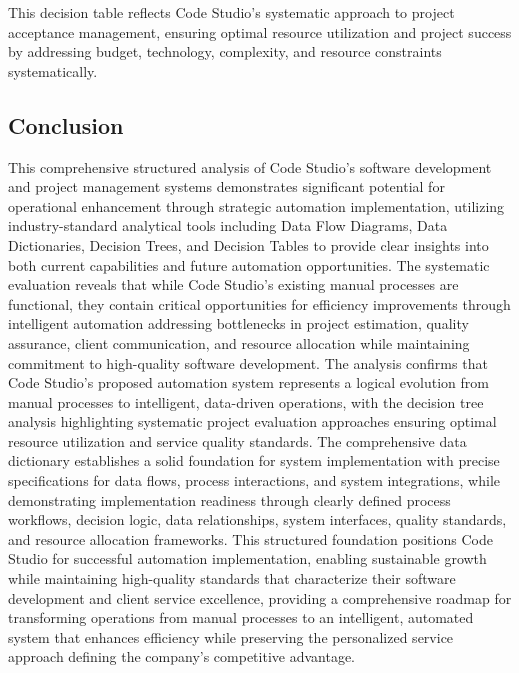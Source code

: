 \documentclass[12pt,a4paper]{article}
\begin{document}
This decision table reflects Code Studio's systematic approach to project acceptance management, ensuring optimal resource utilization and project success by addressing budget, technology, complexity, and resource constraints systematically.

\subsection{Conclusion}

This comprehensive structured analysis of Code Studio's software development and project management systems demonstrates significant potential for operational enhancement through strategic automation implementation, utilizing industry-standard analytical tools including Data Flow Diagrams, Data Dictionaries, Decision Trees, and Decision Tables to provide clear insights into both current capabilities and future automation opportunities. The systematic evaluation reveals that while Code Studio's existing manual processes are functional, they contain critical opportunities for efficiency improvements through intelligent automation addressing bottlenecks in project estimation, quality assurance, client communication, and resource allocation while maintaining commitment to high-quality software development. The analysis confirms that Code Studio's proposed automation system represents a logical evolution from manual processes to intelligent, data-driven operations, with the decision tree analysis highlighting systematic project evaluation approaches ensuring optimal resource utilization and service quality standards. The comprehensive data dictionary establishes a solid foundation for system implementation with precise specifications for data flows, process interactions, and system integrations, while demonstrating implementation readiness through clearly defined process workflows, decision logic, data relationships, system interfaces, quality standards, and resource allocation frameworks. This structured foundation positions Code Studio for successful automation implementation, enabling sustainable growth while maintaining high-quality standards that characterize their software development and client service excellence, providing a comprehensive roadmap for transforming operations from manual processes to an intelligent, automated system that enhances efficiency while preserving the personalized service approach defining the company's competitive advantage.
\end{document}
